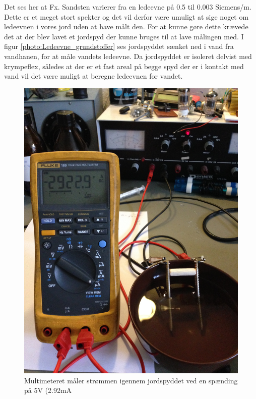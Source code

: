 Det ses her at Fx. Sandsten varierer fra en ledeevne på 0.5 til 0.003 Siemens/m. Dette er et meget stort spekter og det vil derfor være umuligt at sige noget om ledeevnen i vores jord uden at have målt den. For at kunne gøre dette krævede det at der blev lavet et jordspyd der kunne bruges til at lave målingen med. I figur \ref{photo:Ledeevne_grundstoffer} ses jordspyddet sænket ned i vand fra vandhanen, for at måle vandets ledeevne. Da jordspyddet er isoleret delvist med krympeflex, således at der er et fast areal på begge spyd der er i kontakt med vand vil det være muligt at beregne ledeevnen for vandet.

\begin{figure}[H]
	\centering 
	\includegraphics[scale=0.07]{HardwareArkitektur/Sensore/Jordfugt_billeder/Jordspyd_i_vand.JPG}
	\caption{Multimeteret måler strømmen igennem jordspyddet ved en spænding på 5V (2.92mA}
	\label{photo:Jordspyd_vand}
\end{figure}  

